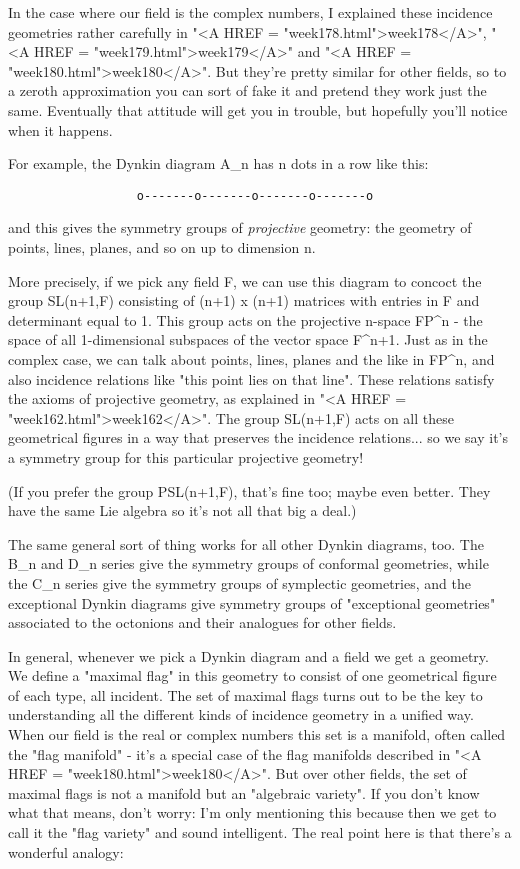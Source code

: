 In the case where our field is the complex numbers, I explained these
incidence geometries rather carefully in "<A HREF =
"week178.html">week178</A>", "<A HREF =
"week179.html">week179</A>" and "<A HREF =
"week180.html">week180</A>".  But they're pretty similar for other
fields, so to a zeroth approximation you can sort of fake it and pretend
they work just the same.  Eventually that attitude will get you in
trouble, but hopefully you'll notice when it happens.

For example, the Dynkin diagram A_{n} has n dots in a row like this:


\begin{verbatim}
                  o-------o-------o-------o-------o
\end{verbatim}
    
and this gives the symmetry groups of \emph{projective} geometry: the
geometry of points, lines, planes, and so on up to dimension n.

More precisely, if we pick any field F, we can use this diagram to
concoct the group SL(n+1,F) consisting of (n+1) x (n+1) matrices with
entries in F and determinant equal to 1.  This group acts on the
projective n-space FP^{n} - the space of all 1-dimensional
subspaces of the vector space F^{n+1}.  Just as in the complex
case, we can talk about points, lines, planes and the like in
FP^{n}, and also incidence relations like "this point lies
on that line".  These relations satisfy the axioms of projective
geometry, as explained in "<A HREF =
"week162.html">week162</A>".  The group SL(n+1,F) acts on all these
geometrical figures in a way that preserves the incidence
relations... so we say it's a symmetry group for this particular
projective geometry!

(If you prefer the group PSL(n+1,F), that's fine too; maybe even better.
They have the same Lie algebra so it's not all that big a deal.)

The same general sort of thing works for all other Dynkin diagrams, too.
The B_{n} and D_{n} series give the symmetry groups of
conformal geometries, while the C_{n} series give the symmetry
groups of symplectic geometries, and the exceptional Dynkin diagrams
give symmetry groups of "exceptional geometries" associated to
the octonions and their analogues for other fields.

In general, whenever we pick a Dynkin diagram and a field we get a
geometry.  We define a "maximal flag" in this geometry to
consist of one geometrical figure of each type, all incident.  The set
of maximal flags turns out to be the key to understanding all the
different kinds of incidence geometry in a unified way.  When our field
is the real or complex numbers this set is a manifold, often called the
"flag manifold" - it's a special case of the flag manifolds
described in "<A HREF = "week180.html">week180</A>".  But over
other fields, the set of maximal flags is not a manifold but an
"algebraic variety".  If you don't know what that means, don't
worry: I'm only mentioning this because then we get to call it the
"flag variety" and sound intelligent.  The real point here is
that there's a wonderful analogy:

